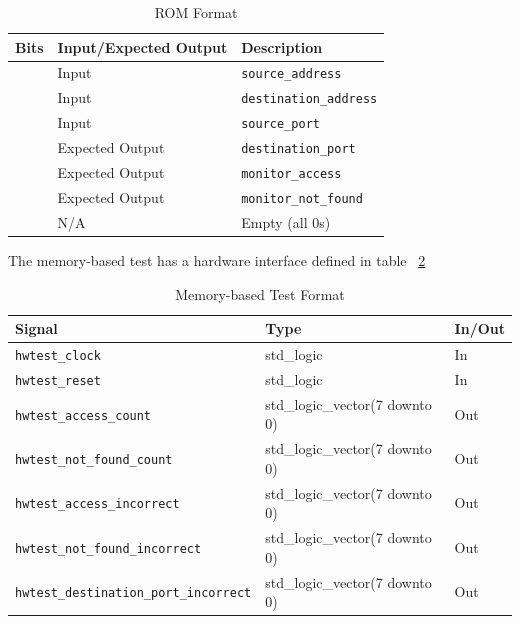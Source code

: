 \documentclass{article}
\begin{document}
\begin{table}[ht]
    \begin{center}
        \begin{tabular}{lll}\hline
        Bits & Input/Expected Output & Description \\
        \hline
        [47:0] & Input & \texttt{source\_address} \\
        \hline
        [95:48] & Input & \texttt{destination\_address} \\
        \hline
        [99:96] & Input & \texttt{source\_port} \\
        \hline
        [103:100] & Expected Output & \texttt{destination\_port} \\
        \hline
        [104] & Expected Output & \texttt{monitor\_access} \\
        \hline
        [105] & Expected Output & \texttt{monitor\_not\_found} \\
        \hline
        [127:106] & N/A & Empty (all 0s) \\
        \hline
        \end{tabular}
        \caption{ROM Format}\label{tab:rom}
    \end{center}
\end{table}

The memory-based test has a hardware interface defined in table ~\ref{tab:test2}

\begin{table}[ht]
    \begin{center}
        \begin{tabular}{lll}\hline
        Signal & Type & In/Out \\
        \hline
        \texttt{hwtest\_clock} & std\_logic & In \\
        \hline
        \texttt{hwtest\_reset} & std\_logic & In \\
        \hline
        \texttt{hwtest\_access\_count} & std\_logic\_vector(7 downto 0) & Out \\
        \hline
        \texttt{hwtest\_not\_found\_count} & std\_logic\_vector(7 downto 0) & Out \\
        \hline
        \texttt{hwtest\_access\_incorrect} & std\_logic\_vector(7 downto 0) & Out \\
        \hline
        \texttt{hwtest\_not\_found\_incorrect} & std\_logic\_vector(7 downto 0) & Out \\
        \hline
        \texttt{hwtest\_destination\_port\_incorrect} & std\_logic\_vector(7 downto 0) & Out \\
        \hline
        \end{tabular}
        \caption{Memory-based Test Format}\label{tab:test2}
    \end{center}
\end{table}
\end{document}
